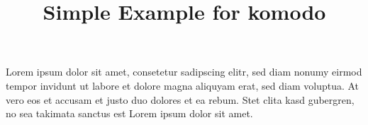 \documentclass[12pt]{article}
\title{Simple Example for komodo}
\begin{document}
Lorem ipsum dolor sit amet, consetetur sadipscing elitr, sed diam nonumy eirmod tempor invidunt ut labore et dolore magna aliquyam erat, sed diam voluptua. At vero eos et accusam et justo duo dolores et ea rebum. Stet clita kasd gubergren, no sea takimata sanctus est Lorem ipsum dolor sit amet.

\cite{cobra}
\cite{tourofgo}
\cite{mux}
\cite{viper}



\end{document}
